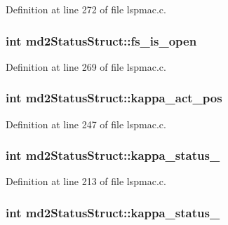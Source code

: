 Definition at line 272 of file lspmac.c.\hypertarget{structmd2StatusStruct_aca3722c109e6646bd41fb269a32261f2}{
\subsubsection[{fs\_\-is\_\-open}]{\setlength{\rightskip}{0pt plus 5cm}int {\bf md2StatusStruct::fs\_\-is\_\-open}}}
\label{structmd2StatusStruct_aca3722c109e6646bd41fb269a32261f2}


Definition at line 269 of file lspmac.c.\hypertarget{structmd2StatusStruct_ac384fb7073387dd5dcb2e85a00ec8a77}{
\subsubsection[{kappa\_\-act\_\-pos}]{\setlength{\rightskip}{0pt plus 5cm}int {\bf md2StatusStruct::kappa\_\-act\_\-pos}}}
\label{structmd2StatusStruct_ac384fb7073387dd5dcb2e85a00ec8a77}


Definition at line 247 of file lspmac.c.\hypertarget{structmd2StatusStruct_ab152694bc32d37c1d180f55e8d282020}{
\subsubsection[{kappa\_\-status\_\-1}]{\setlength{\rightskip}{0pt plus 5cm}int {\bf md2StatusStruct::kappa\_\-status\_}}}
\label{structmd2StatusStruct_ab152694bc32d37c1d180f55e8d282020}


Definition at line 213 of file lspmac.c.\hypertarget{structmd2StatusStruct_af6891f5f8dcfc62668f64c583042c6bc}{
\subsubsection[{kappa\_\-status\_\-2}]{\setlength{\rightskip}{0pt plus 5cm}int {\bf md2StatusStruct::kappa\_\-status\_}}}
\label{structmd2StatusStruct_af6891f5f8dcfc62668f64c583042c6bc}



